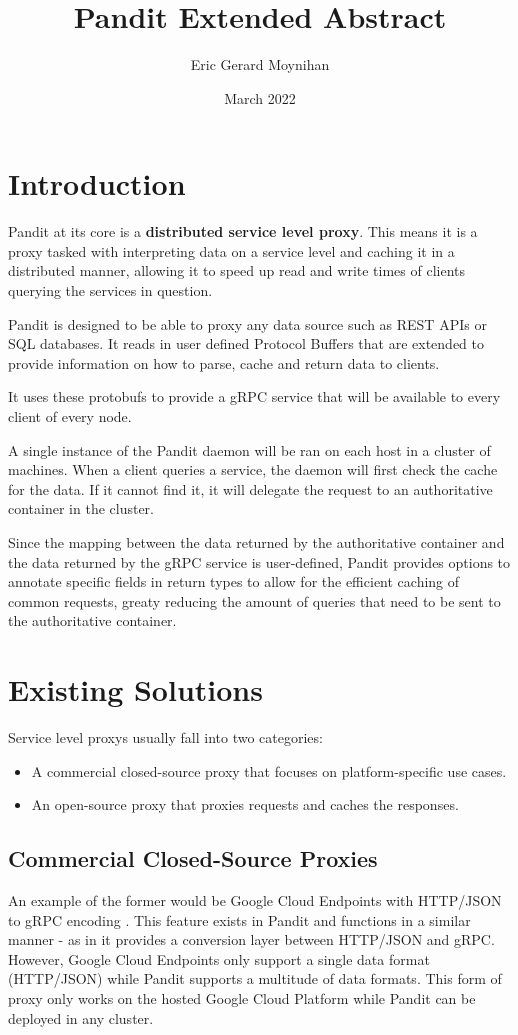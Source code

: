 \documentclass{article}
\title{Pandit Extended Abstract}
\author{Eric Gerard Moynihan}
\date{March 2022}
\begin{document}
\maketitle

\section{Introduction}
Pandit at its core is a \textbf{distributed service level proxy}.
This means it is a proxy tasked with interpreting data on a service level and caching it
in a distributed manner, allowing it to speed up read and write times of clients querying the services
in question.

Pandit is designed to be able to proxy any data source such as REST APIs or SQL databases.
It reads in user defined Protocol Buffers \cite{protobufs} that are extended to provide information on
how to parse, cache and return data to clients.

It uses these protobufs to provide a gRPC \cite{grpc} service that will be available to every client of every node.

A single instance of the Pandit daemon will be ran on each host in a cluster of machines. When a client queries
a service, the daemon will first check the cache for the data. If it cannot find it, it will delegate the request
to an authoritative container in the cluster.

Since the mapping between the data returned by the authoritative container and the data returned by the gRPC service is
user-defined, Pandit provides options to annotate specific fields in return types to allow for the efficient caching of
common requests, greaty reducing the amount of queries that need to be sent to the authoritative container.

\section{Existing Solutions}
Service level proxys usually fall into two categories:
\begin{itemize}
    \item A commercial closed-source proxy that focuses on platform-specific use cases.
    \item An open-source proxy that proxies requests and caches the responses.
\end{itemize}
\subsection{Commercial Closed-Source Proxies}
An example of the former would be Google Cloud Endpoints with HTTP/JSON to gRPC encoding \cite{cloud_endpoints}.
This feature exists in Pandit and functions in a similar manner - as in it provides a conversion layer between
HTTP/JSON and gRPC. However, Google Cloud Endpoints only support a single data format (HTTP/JSON) while Pandit supports a
multitude of data formats.
This form of proxy only works on the hosted Google Cloud Platform \cite{google_cloud_platform} while Pandit can be deployed
in any cluster.
\end{document}
